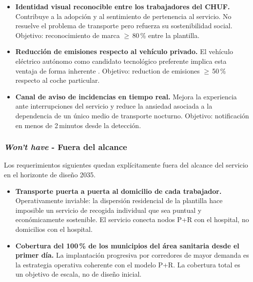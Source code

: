 \begin{itemize}

	\item \textbf{Identidad visual reconocible entre los trabajadores
	del CHUF.} Contribuye a la adopción y al sentimiento de
	pertenencia al servicio. No resuelve el problema de transporte
	pero refuerza su sostenibilidad social.
	Objetivo: reconocimiento de marca $\geq$\,80\,\% entre la plantilla.

	\item \textbf{Reducción de emisiones respecto al vehículo privado.}
	El vehículo eléctrico autónomo como candidato tecnológico preferente
	implica esta ventaja de forma inherente \parencite{SHOW2024Legacy}.
	Objetivo: reduction de emisiones $\geq$\,50\,\% respecto al coche
	particular.

	\item \textbf{Canal de aviso de incidencias en tiempo real.}
	Mejora la experiencia ante interrupciones del servicio y reduce
	la ansiedad asociada a la dependencia de un único medio de
	transporte nocturno.
	Objetivo: notificación en menos de 2\,minutos desde la detección.

\end{itemize}

\subsubsection{\textit{Won't have} - Fuera del alcance}
\label{sec:moscow-wont}

Los requerimientos siguientes quedan explícitamente fuera del
alcance del servicio en el horizonte de diseño 2035.

\begin{itemize}

	\item \textbf{Transporte puerta a puerta al domicilio de cada
	trabajador.} Operativamente inviable: la dispersión residencial
	de la plantilla hace imposible un servicio de recogida individual
	que sea puntual y económicamente sostenible. El servicio conecta
	nodos P+R con el hospital, no domicilios con el hospital.

	\item \textbf{Cobertura del 100\,\% de los municipios del área
	sanitaria desde el primer día.} La implantación progresiva por
	corredores de mayor demanda es la estrategia operativa coherente
	con el modelo P+R. La cobertura total es un objetivo de escala,
	no de diseño inicial.

\end{itemize}

